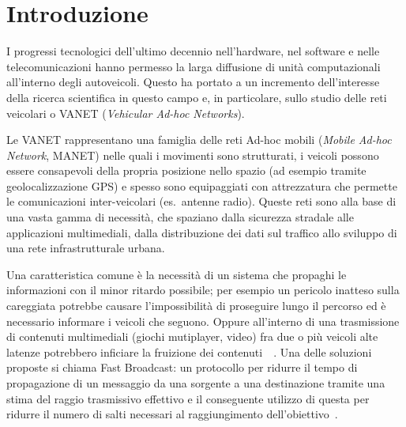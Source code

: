 
\chapter{Introduzione}\label{chap:introduction}
I progressi tecnologici dell'ultimo decennio nell'hardware, nel software e nelle telecomunicazioni hanno permesso
la larga diffusione di unità computazionali all'interno degli autoveicoli. %
Questo ha portato a un incremento dell'interesse della ricerca scientifica in questo campo e, in particolare,
sullo studio delle reti veicolari o VANET (\textit{Vehicular Ad-hoc Networks}).

Le VANET rappresentano una famiglia delle reti Ad-hoc mobili (\textit{Mobile Ad-hoc Network}, MANET)
nelle quali i movimenti sono strutturati, i veicoli possono essere consapevoli della propria posizione nello spazio (ad esempio tramite geolocalizzazione GPS)
e spesso sono equipaggiati con attrezzatura che permette le comunicazioni inter-veicolari (es.~antenne radio).
Queste reti sono alla base di una vasta gamma di necessità, che spaziano dalla sicurezza stradale alle applicazioni multimediali,
dalla distribuzione dei dati sul traffico allo sviluppo di una rete infrastrutturale urbana.

Una caratteristica comune è la necessità di un sistema che propaghi le informazioni
con il minor ritardo possibile; per esempio un pericolo inatteso sulla careggiata potrebbe causare l'impossibilità di proseguire
lungo il percorso ed è necessario informare i veicoli che seguono.
Oppure all'interno di una trasmissione di contenuti multimediali (giochi mutiplayer, video) fra due o più veicoli
alte latenze potrebbero inficiare la fruizione dei contenuti~\cite{1580935}~\cite{PantelW02}.
Una delle soluzioni proposte si chiama Fast Broadcast: un protocollo per ridurre il tempo di propagazione
di un messaggio da una sorgente a una destinazione tramite una stima del raggio trasmissivo effettivo e
il conseguente utilizzo di questa per ridurre il numero di salti necessari al raggiungimento dell'obiettivo~\cite{Palazzi07howdo}.


